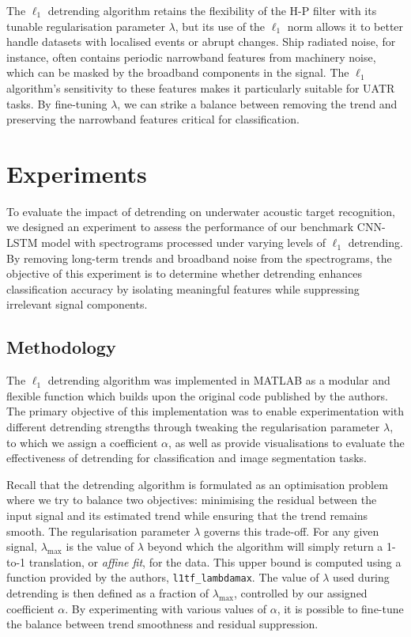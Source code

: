 The $\ell_1$ detrending algorithm retains the flexibility of the H-P filter with its tunable regularisation parameter $\lambda$, but its use of the $\ell_1$ norm allows it to better handle datasets with localised events or abrupt changes. Ship radiated noise, for instance, often contains periodic narrowband features from machinery noise, which can be masked by the broadband components in the signal. The $\ell_1$ algorithm’s sensitivity to these features makes it particularly suitable for UATR tasks. By fine-tuning $\lambda$, we can strike a balance between removing the trend and preserving the narrowband features critical for classification.

\section{Experiments}

To evaluate the impact of detrending on underwater acoustic target recognition, we designed an experiment to assess the performance of our benchmark CNN-LSTM model with spectrograms processed under varying levels of $\ell_1$ detrending. By removing long-term trends and broadband noise from the spectrograms, the objective of this experiment is to determine whether detrending enhances classification accuracy by isolating meaningful features while suppressing irrelevant signal components. 

\subsection{Methodology}

The $\ell_1$ detrending algorithm was implemented in MATLAB as a modular and flexible function which builds upon the original code published by the authors. The primary objective of this implementation was to enable experimentation with different detrending strengths through tweaking the regularisation parameter $\lambda$, to which we assign a coefficient $\alpha$, as well as provide visualisations to evaluate the effectiveness of detrending for classification and image segmentation tasks.

Recall that the detrending algorithm is formulated as an optimisation problem where we try to balance two objectives: minimising the residual between the input signal and its estimated trend while ensuring that the trend remains smooth. The regularisation parameter $\lambda$ governs this trade-off. For any given signal, $\lambda_{\text{max}}$ is the value of $\lambda$ beyond which the algorithm will simply return a 1-to-1 translation, or \textit{affine fit}, for the data. This upper bound is computed using a function provided by the authors, \texttt{l1tf\_lambdamax}. The value of $\lambda$ used during detrending is then defined as a fraction of $\lambda_{\text{max}}$, controlled by our assigned coefficient $\alpha$. By experimenting with various values of $\alpha$, it is possible to fine-tune the balance between trend smoothness and residual suppression.

